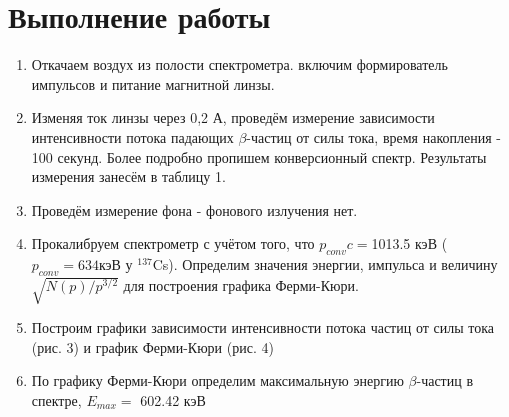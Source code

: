 \documentclass[a4paper]{article}
\begin{document}
\section{Выполнение работы}

\begin{enumerate}
    \item Откачаем воздух из полости спектрометра. включим формирователь импульсов и питание магнитной линзы.
    \item Изменяя ток линзы через 0,2 А, проведём измерение зависимости интенсивности потока падающих $\beta$-частиц от силы тока, время накопления - 100 секунд. Более подробно пропишем конверсионный спектр. Результаты измерения занесём в таблицу 1.
    \item Проведём измерение фона - фонового излучения нет.
    \item Прокалибруем спектрометр с учётом того, что $p_{conv}c = $1013.5 кэВ ($p_{conv} = 634 $кэВ у $^{137}$Cs). Определим значения энергии, импульса и величину $\sqrt{N(p)/p^{3/2}}$ для построения графика Ферми-Кюри.
    \item Построим графики зависимости интенсивности потока частиц от силы тока (рис. 3) и график Ферми-Кюри (рис. 4)
    
    \item По графику Ферми-Кюри определим максимальную энергию $\beta$-частиц в спектре, $E_{max} = $ 602.42 кэВ


\end{enumerate}
\end{document}
